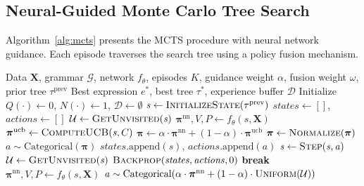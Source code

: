 \subsection{Neural-Guided Monte Carlo Tree Search}
\label{subsec:mcts}

Algorithm~\ref{alg:mcts} presents the MCTS procedure with neural network guidance. Each episode traverses the search tree using a policy fusion mechanism.

\begin{algorithm}[htbp]
\caption{Neural-Guided MCTS for Symbolic Regression}
\label{alg:mcts}
\begin{algorithmic}[1]
\Require Data $\mathbf{X}$, grammar $\mathcal{G}$, network $f_{\theta}$, episodes $K$, guidance weight $\alpha$, fusion weight $\omega$, prior tree $\tau^{\text{prev}}$
\Ensure Best expression $e^{*}$, best tree $\tau^{*}$, experience buffer $\mathcal{D}$
\State Initialize $Q(\cdot) \leftarrow 0$, $N(\cdot) \leftarrow 1$, $\mathcal{D} \leftarrow \emptyset$
\State $\mathit{s} \leftarrow \textsc{InitializeState}(\tau^{\text{prev}})$
    \State $\mathit{states} \leftarrow []$, $\mathit{actions} \leftarrow []$
    \State $\mathcal{U} \leftarrow \textsc{GetUnvisited}(\mathit{s})$
     
        \State $\boldsymbol{\pi}^{\text{nn}}, V, P \leftarrow f_{\theta}(\mathit{s}, \mathbf{X})$
        \State $\boldsymbol{\pi}^{\text{ucb}} \leftarrow \textsc{ComputeUCB}(\mathit{s}, C)$
        \State $\boldsymbol{\pi} \leftarrow \alpha \cdot \boldsymbol{\pi}^{\text{nn}} + (1-\alpha) \cdot \boldsymbol{\pi}^{\text{ucb}}$
        \State $\boldsymbol{\pi} \leftarrow \textsc{Normalize}(\boldsymbol{\pi})$
        \State $\mathit{a} \sim \text{Categorical}(\boldsymbol{\pi})$
        \State $\mathit{states}.\text{append}(\mathit{s})$, $\mathit{actions}.\text{append}(\mathit{a})$
        \State $\mathit{s} \leftarrow \textsc{Step}(\mathit{s}, \mathit{a})$
        \State $\mathcal{U} \leftarrow \textsc{GetUnvisited}(\mathit{s})$
            \State $\textsc{Backprop}(\mathit{states}, \mathit{actions}, 0)$
            \State \textbf{break}
        \EndIf
    \EndWhile
     
        \State $\boldsymbol{\pi}^{\text{nn}}, V, P \leftarrow f_{\theta}(\mathit{s}, \mathbf{X})$
        \State $\mathit{a} \sim \text{Categorical}(\alpha \cdot \boldsymbol{\pi}^{\text{nn}} + (1-\alpha) \cdot \textsc{Uniform}(\mathcal{U}))$

\end{algorithmic}
\end{algorithm}
